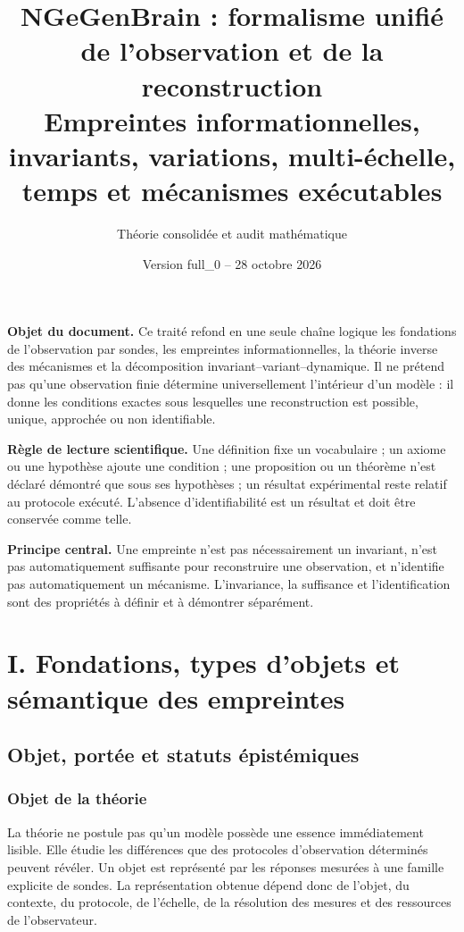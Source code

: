 \documentclass[11pt,oneside]{book}
\title{\Huge\bfseries NGeGenBrain : formalisme unifié de l'observation et de la reconstruction\\[0.6em]
\Large Empreintes informationnelles, invariants, variations, multi-échelle, temps et mécanismes exécutables}
\author{Théorie consolidée et audit mathématique}
\date{Version full\_0 -- 28 octobre 2026}
\theoremstyle{definition}
\theoremstyle{remark}
\newcommand{\1}{\mathbf 1}
\begin{document}
\hypersetup{pageanchor=false}
\frontmatter
\maketitle
\thispagestyle{empty}
\begin{center}\begin{minipage}{0.92\textwidth}
\textbf{Objet du document.} Ce traité refond en une seule chaîne logique les fondations de l'observation par sondes, les empreintes informationnelles, la théorie inverse des mécanismes et la décomposition invariant--variant--dynamique. Il ne prétend pas qu'une observation finie détermine universellement l'intérieur d'un modèle : il donne les conditions exactes sous lesquelles une reconstruction est possible, unique, approchée ou non identifiable.

\medskip
\textbf{Règle de lecture scientifique.} Une définition fixe un vocabulaire ; un axiome ou une hypothèse ajoute une condition ; une proposition ou un théorème n'est déclaré démontré que sous ses hypothèses ; un résultat expérimental reste relatif au protocole exécuté. L'absence d'identifiabilité est un résultat et doit être conservée comme telle.

\medskip
\textbf{Principe central.} Une empreinte n'est pas nécessairement un invariant, n'est pas automatiquement suffisante pour reconstruire une observation, et n'identifie pas automatiquement un mécanisme. L'invariance, la suffisance et l'identification sont des propriétés à définir et à démontrer séparément.
\end{minipage}\end{center}
\clearpage
\tableofcontents
\hypersetup{pageanchor=true}
\mainmatter


\part{I. Fondations, types d’objets et sémantique des empreintes}

\chapter{Objet, portée et statuts épistémiques}
\section{Objet de la théorie}
La théorie ne postule pas qu'un modèle possède une essence immédiatement lisible. Elle étudie les différences que des protocoles d'observation déterminés peuvent révéler. Un objet est représenté par les réponses mesurées à une famille explicite de sondes. La représentation obtenue dépend donc de l'objet, du contexte, du protocole, de l'échelle, de la résolution des mesures et des ressources de l'observateur.
\end{document}
